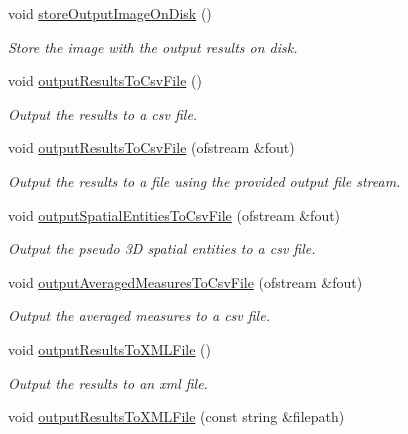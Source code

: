 \begin{DoxyCompactItemize}
void \hyperlink{classmultiscale_1_1analysis_1_1Detector_aa15a7546c4f8f77fcf85632386a4c5d5}{store\-Output\-Image\-On\-Disk} ()
\begin{DoxyCompactList}\small\item\em Store the image with the output results on disk. \end{DoxyCompactList}\item 
void \hyperlink{classmultiscale_1_1analysis_1_1Detector_a2055dc183dd3601d9979bc99a3222eb4}{output\-Results\-To\-Csv\-File} ()
\begin{DoxyCompactList}\small\item\em Output the results to a csv file. \end{DoxyCompactList}\item 
void \hyperlink{classmultiscale_1_1analysis_1_1Detector_a8f77ceb1535be09ef149aedcd6b1a84e}{output\-Results\-To\-Csv\-File} (ofstream \&fout)
\begin{DoxyCompactList}\small\item\em Output the results to a file using the provided output file stream. \end{DoxyCompactList}\item 
void \hyperlink{classmultiscale_1_1analysis_1_1Detector_a64d541cd53a16dc5f204413820c6b0ef}{output\-Spatial\-Entities\-To\-Csv\-File} (ofstream \&fout)
\begin{DoxyCompactList}\small\item\em Output the pseudo 3\-D spatial entities to a csv file. \end{DoxyCompactList}\item 
void \hyperlink{classmultiscale_1_1analysis_1_1Detector_a3f4f3192d392f26e324ef9760820d904}{output\-Averaged\-Measures\-To\-Csv\-File} (ofstream \&fout)
\begin{DoxyCompactList}\small\item\em Output the averaged measures to a csv file. \end{DoxyCompactList}\item 
void \hyperlink{classmultiscale_1_1analysis_1_1Detector_a574c1c58c9e0bab3d224e5b0a77e410a}{output\-Results\-To\-X\-M\-L\-File} ()
\begin{DoxyCompactList}\small\item\em Output the results to an xml file. \end{DoxyCompactList}\item 
void \hyperlink{classmultiscale_1_1analysis_1_1Detector_a9f5690049f55799ac7a2741e97de679e}{output\-Results\-To\-X\-M\-L\-File} (const string \&filepath)

\end{DoxyCompactItemize}
